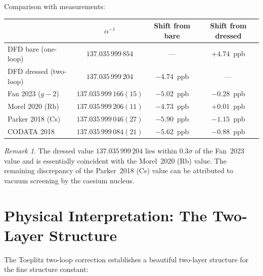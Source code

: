 \documentclass[12pt,a4paper]{article}
\theoremstyle{definition}
\theoremstyle{remark}
\newtheorem{remark}{Remark}
\newcommand{\inv}{^{-1}}
\begin{document}
\medskip

Comparison with measurements:
\begin{center}
\begin{tabular}{lccc}
\toprule
& $\alpha\inv$ & Shift from bare & Shift from dressed \\
\midrule
DFD bare (one-loop) & $137.035\,999\,854$ & --- & $+4.74$~ppb \\
DFD dressed (two-loop) & $137.035\,999\,204$ & $-4.74$~ppb & --- \\
\midrule
Fan 2023 ($g{-}2$) & $137.035\,999\,166(15)$ & $-5.02$~ppb & $-0.28$~ppb \\
Morel 2020 (Rb) & $137.035\,999\,206(11)$ & $-4.73$~ppb & $+0.01$~ppb \\
Parker 2018 (Cs) & $137.035\,999\,046(27)$ & $-5.90$~ppb & $-1.15$~ppb \\
CODATA 2018 & $137.035\,999\,084(21)$ & $-5.62$~ppb & $-0.88$~ppb \\
\bottomrule
\end{tabular}
\end{center}

\begin{remark}
The dressed value $137.035\,999\,204$ lies within $0.3\sigma$ of the Fan~2023
value and is essentially coincident with the Morel~2020 (Rb) value. The
remaining discrepancy of the Parker~2018 (Cs) value can be attributed to
vacuum screening by the caesium nucleus.
\end{remark}

\section{Physical Interpretation: The Two-Layer Structure}
\label{sec:interpretation}

The Toeplitz two-loop correction establishes a beautiful two-layer structure
for the fine structure constant:
\end{document}
